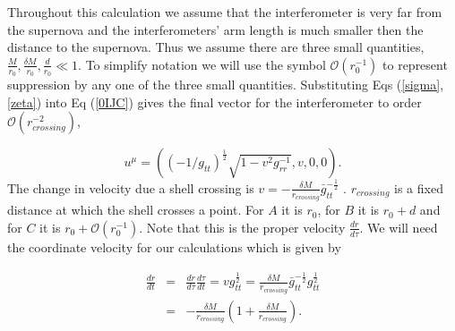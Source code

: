 \documentclass[aps,showpacs,onecolumn,floats,prd,superscriptaddress,nofootinbib]{revtex4-1}
\begin{document}
Throughout this calculation we assume that the interferometer is very far from the supernova and the interferometers' arm length is much smaller then the distance to the supernova. Thus we assume there are three small quantities, $\frac{M}{r_0}, \frac{\delta M}{r_0}, \frac{d}{r_0}\ll1$. To simplify notation we will use the symbol $\mathcal{O}(r^{-1}_{0})$ to represent suppression by any one of the three small quantities. 
Substituting Eqs (\ref{sigma}, \ref{zeta}) into Eq (\ref{0IJC}) gives the final vector for the interferometer to order $\mathcal{O}(r_{crossing}^{-2})$,

\begin{equation}
	u^\mu = \left( (-1/g_{tt})^\frac{1}{2} \sqrt{1-v^2g_{rr}^{-1}}, v , 0, 0 \right).	\label{5}
\end{equation}
The change in velocity due a shell crossing is $v = -\frac{\delta M}{r_{crossing}} \bar{g}_{tt}^{-\frac{1}{2}} $ . $r_{crossing}$ is a fixed distance at which the shell crosses a point. For $A$ it is $r_0$, for $B$ it is $r_0 + d$ and for $C$ it is $r_0 + \mathcal{O}(r_0^{-1})$. Note that this is the proper velocity $\frac{dr}{d\tau}$. We will need the coordinate velocity for our calculations which is given by 

\begin{eqnarray}
	\frac{dr}{dt} &=& \frac{dr}{d \tau} \frac{d \tau}{dt} = v g_{tt}^{\frac{1}{2}} =  \frac{\delta M}{r_{crossing}} \bar{g}_{tt}^{-\frac{1}{2}} g_{tt}^\frac{1}{2} \nonumber \\
	&=& -\frac{\delta M}{r_{crossing}} \left( 1 + \frac{\delta M}{r_{crossing}} \right).
\end{eqnarray}
\end{document}
